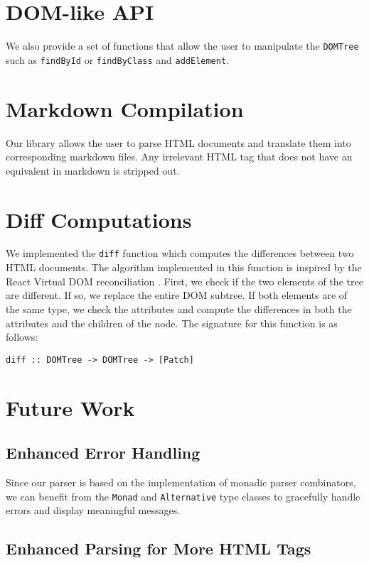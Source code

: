 \documentclass[12pt, a4paper]{article}
\begin{document}
\section{DOM-like API}

We also provide a set of functions that allow the user to manipulate the \texttt{DOMTree} such as \texttt{findById} or \texttt{findByClass} and \texttt{addElement}.

\section{Markdown Compilation}

Our library allows the user to parse HTML documents and translate them into corresponding markdown files. Any irrelevant HTML tag that does not have an equivalent in markdown is stripped out.

\section{Diff Computations}

We implemented the \texttt{diff} function which computes the differences between two HTML documents.
The algorithm implemented in this function is inspired by the React Virtual DOM reconciliation \cite{reactdiff}. First, we check if the two elements of the tree are different. If so, we replace the entire DOM subtree. If both elements are of the same type, we check the attributes and compute the differences in both the attributes and the children of the node.
The signature for this function is as follows:

\begin{verbatim}
diff :: DOMTree -> DOMTree -> [Patch]
\end{verbatim}

\section{Future Work}

\subsection{Enhanced Error Handling}

Since our parser is based on the implementation of monadic parser combinators, we can benefit from the \texttt{Monad} and \texttt{Alternative} type classes to gracefully handle errors and display meaningful messages.

\subsection{Enhanced Parsing for More HTML Tags}
\end{document}
